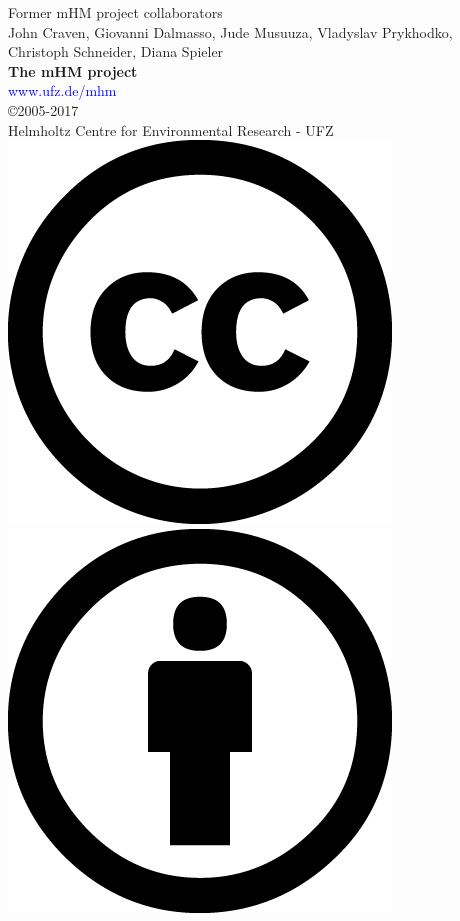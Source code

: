 \documentclass[twoside]{book}
\newcommand{\+}{\discretionary{\mbox{\scriptsize$\hookleftarrow$}}{}{}}
\begin{document}
\newpage

\vspace*{2cm}
\begin{center}%
{\large Former mHM project collaborators}\\
\vspace*{0.5cm}
{\large 
John Craven,
Giovanni Dalmasso,
Jude Musuuza,
Vladyslav Prykhodko,
Christoph Schneider,
Diana Spieler
}\\
\vspace*{15.5cm}
{\huge \textbf{The mHM project}}\\
\textcolor{blue}{www.ufz.de/mhm}\\
\vspace*{0.5cm}
{\large \copyright 2005-2017}\\
{\large Helmholtz Centre for Environmental Research - UFZ}\\
\vspace*{0.2cm}
\includegraphics[totalheight=5.mm]{../doc/figures/cc_large.png}\,%
\includegraphics[totalheight=5.mm]{../doc/figures/by_large.png}\,%

\end{center}
\end{document}
